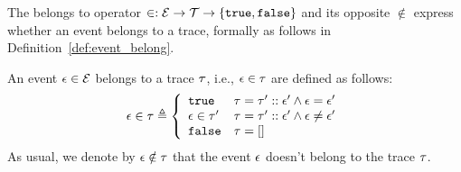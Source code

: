 The belongs to operator $\in : \mathcal{E} \to \mathcal{T} \to \{\mathtt{true}, \mathtt{false} \} $ and its opposite $\not\in$
express whether an event belongs to a trace, formally as follows in Definition~\ref{def:event_belong}.
\begin{defn}
  \label{def:event_belong}
    An event $\mathtt{\epsilon} \in \mathcal{E}$ belongs to a trace $\mathtt{\tau}$, i.e., $\mathtt{\epsilon} \in \mathtt{\tau}$ are defined as follows:
  \begin{equation}
    \event \in \trace  
    \triangleq \left\{
    \begin{array}{ll} 
      \etrue                  & \trace =  \trace' :: \event'
       \land \event = \event'
                                \\
      \event \in \trace' & \trace =  \trace' :: \event'
      \land \event \neq \event' \\ 
      \efalse                 & \trace = []
    \end{array}
    \right.
  \end{equation}
  As usual, we denote by $\mathtt{\epsilon} \notin \mathtt{\tau}$ that the event $\mathtt{\epsilon}$ doesn't belong to the trace $\mathtt{\tau}$.
  \end{defn}
